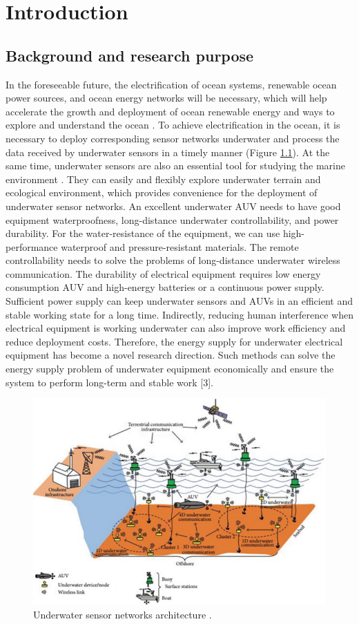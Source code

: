 \chapter{Introduction}
\section{Background and research purpose}
In the foreseeable future, the electrification of ocean systems, renewable ocean power sources, and ocean energy networks will be necessary, which will help accelerate the growth and deployment of ocean renewable energy and ways to explore and understand the ocean \cite{Orekan}. To achieve electrification in the ocean, it is necessary to deploy corresponding sensor networks underwater and process the data received by underwater sensors in a timely manner (Figure \ref{fig:underwater sensor networks}). At the same time, underwater sensors are also an essential tool for studying the marine environment \cite{Heidemann2012}. They can easily and flexibly explore underwater terrain and ecological environment, which provides convenience for the deployment of underwater sensor networks. An excellent underwater AUV needs to have good equipment waterproofness, long-distance underwater controllability, and power durability. For the water-resistance of the equipment, we can use high-performance waterproof and pressure-resistant materials. The remote controllability needs to solve the problems of long-distance underwater wireless communication. The durability of electrical equipment requires low energy consumption AUV and high-energy batteries or a continuous power supply. Sufficient power supply can keep underwater sensors and AUVs in an efficient and stable working state for a long time. Indirectly, reducing human interference when electrical equipment is working underwater can also improve work efficiency and reduce deployment costs. Therefore, the energy supply for underwater electrical equipment has become a novel research direction. Such methods can solve the energy supply problem of underwater equipment economically and ensure the system to perform long-term and stable work [3].

\begin{figure}[htbp]
    \centering
    \includegraphics[width=0.7\linewidth]{images/1_underwater_sensor_networks.png}
    \caption{Underwater sensor networks architecture \cite{Nayyar}.}
    \label{fig:underwater sensor networks}
\end{figure}

